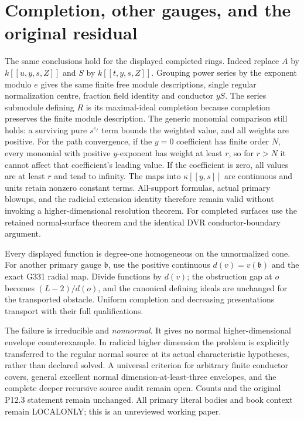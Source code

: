 \documentclass[11pt]{article}
\begin{document}
\section{Completion, other gauges, and the original residual}
The same conclusions hold for the displayed completed rings.
Indeed replace $A$ by $k[[u,y,s,Z]]$ and $S$ by
$k[[t,y,s,Z]]$. Grouping power series by the exponent modulo $e$
gives the same finite free module descriptions, single regular
normalization centre, fraction field identity and conductor $yS$.
The series submodule defining $R$ is its maximal-ideal completion
because completion preserves the finite module description.
The generic monomial comparison still holds: a surviving pure
$s^{e_I}$ term bounds the weighted value, and all weights are positive.
For the path convergence, if the $y=0$ coefficient has finite order
$N$, every monomial with positive $y$-exponent has weight at least $r$,
so for $r>N$ it cannot affect that coefficient's leading value.
If the coefficient is zero, all values are at least $r$ and tend
to infinity. The maps into $\kappa[[y,s]]$ are continuous and
units retain nonzero constant terms. All-support formulas, actual
primary blowups, and the radicial extension identity therefore remain
valid without invoking a higher-dimensional resolution theorem.
For completed surfaces use the retained normal-surface theorem and
the identical DVR conductor-boundary argument.

Every displayed function is degree-one homogeneous on the unnormalized
cone. For another primary gauge $\mathfrak b$, use the positive
continuous $d(v)=v(\mathfrak b)$ and the exact G331 radial map.
Divide functions by $d(v)$; the obstruction gap at $o$ becomes
$(L-2)/d(o)$, and the canonical defining ideals are unchanged for
the transported obstacle. Uniform completion and decreasing
presentations transport with their full qualifications.

The failure is irreducible and \emph{nonnormal}. It gives no normal
higher-dimensional envelope counterexample. In radicial higher
dimension the problem is explicitly transferred to the regular normal
source at its actual characteristic hypotheses, rather than declared
solved. A universal criterion for arbitrary finite conductor covers,
general excellent normal dimension-at-least-three envelopes, and the
complete deeper recursive source audit remain open. Counts and the
original P12.3 statement remain unchanged. All primary literal bodies
and book context remain LOCALONLY; this is an unreviewed working paper.
\end{document}
